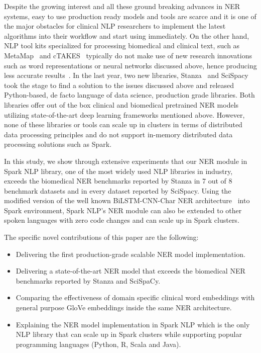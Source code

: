 \documentclass[a4paper,conference]{IEEEtran}
\begin{document}
Despite the growing interest and all these ground breaking advances in NER systems, easy to use production ready models and tools are scarce and it is one of the major obstacles for clinical NLP researchers to implement the latest algorithms into their workflow and start using immediately. On the other hand, NLP tool kits specialized for processing biomedical and clinical text, such as MetaMap~\cite{aronson2010overview} and cTAKES~\cite{savova2010mayo} typically do not make use of new research innovations such as word representations or neural networks discussed above, hence producing less accurate results~\cite{zhang2020biomedical, neumann2019scispacy}. In the last year, two new libraries, Stanza~\cite{zhang2020biomedical} and SciSpacy~\cite{neumann2019scispacy} took the stage to find a solution to the issues discussed above and released Python-based, de facto language of data science, production grade libraries. Both libraries offer out of the box clinical and biomedical pretrained NER models utilizing state-of-the-art deep learning frameworks mentioned above. However, none of these libraries or tools can scale up in clusters in terms of distributed data processing principles and do not support in-memory distributed data processing solutions such as Spark.

In this study, we show through extensive experiments that our NER module in Spark NLP library, one of the most widely used NLP libraries in industry, exceeds the biomedical NER benchmarks reported by Stanza in 7 out of 8 benchmark datasets and in every dataset reported by SciSpacy. Using the modified version of the well known BiLSTM-CNN-Char NER architecture~\cite{chiu2016named} into Spark environment, Spark NLP's NER module can also be extended to other spoken languages with zero code changes and can scale up in Spark clusters. 

The specific novel contributions of this paper are the following:
\begin{itemize}

\item Delivering the first production-grade scalable NER model implementation.

\item Delivering a state-of-the-art NER model that exceeds the biomedical NER benchmarks reported by Stanza and SciSpaCy.

\item Comparing the effectiveness of domain specific clinical word embeddings with general purpose GloVe embeddings inside the same NER architecture.

\item Explaining the NER model implementation in Spark NLP which is the only NLP library that can scale up in Spark clusters while supporting popular programming languages (Python, R, Scala and Java).

\end{itemize}
\end{document}
